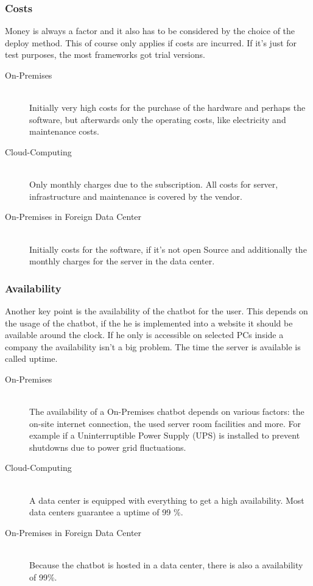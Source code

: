 \documentclass[10pt,final,journal,a4paper,oneside,twocolumn]{IEEEtran}
\begin{document}
\subsubsection{Costs}
Money is always a factor and it also has to be considered by the choice of the deploy method. This of course only applies if costs are incurred. If it's just for test purposes, the most frameworks got trial versions. 
\begin{description}
\item[On-Premises]\hfill \\
Initially very high costs for the purchase of the hardware and perhaps the software, but afterwards only the operating costs, like electricity and maintenance costs. \cite{b29} 
\item[Cloud-Computing]\hfill \\ 
Only monthly charges due to the subscription. All costs for server, infrastructure and maintenance is covered by the vendor.\cite{b29} 
\item[On-Premises in Foreign Data Center]\hfill \\
Initially costs for the software, if it's not open Source and additionally the monthly charges for the server in the data center.
\end{description}

\subsubsection{Availability}
Another key point is the availability of the chatbot for the user. This depends on the usage of the chatbot, if the he is implemented into a website it should be available around the clock. If he only is accessible on selected PCs inside a company the availability isn't a big problem. The time the server is available is called uptime. 
\begin{description}
\item[On-Premises]\hfill \\
The availability of a On-Premises chatbot depends on various factors: the on-site internet connection, the used server room facilities and more. For example if a Uninterruptible Power Supply (UPS) is installed to prevent shutdowns due to power grid fluctuations. 
\item[Cloud-Computing]\hfill \\ 
A data center is equipped with everything to get a high availability. Most data centers guarantee a uptime of 99 \%. \cite{b30}
\item[On-Premises in Foreign Data Center]\hfill \\
Because the chatbot is hosted in a data center, there is also a availability of 99\%.
\end{description}
\end{document}
